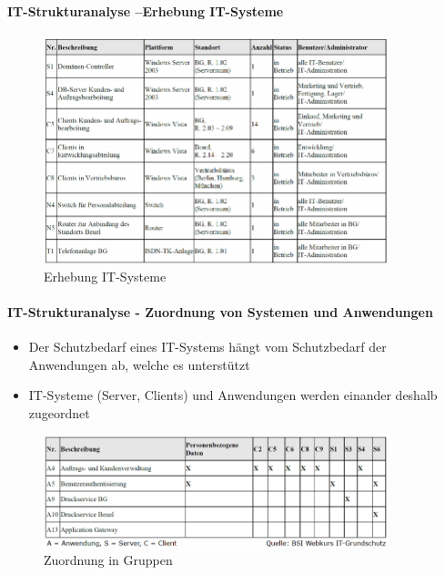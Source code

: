 \documentclass[10pt,a4paper]{article}
\begin{document}
\paragraph*{IT-Strukturanalyse –Erhebung IT-Systeme}
\begin{figure}[H]
    \begin{center}
    \includegraphics[width=10cm]{images/Erhebung IT-Systeme.png}
    \caption{Erhebung IT-Systeme}
    \label{Erhebung IT-Systeme}
    \end{center}
\end{figure}

\paragraph*{IT-Strukturanalyse - Zuordnung von Systemen und Anwendungen}
\begin{itemize}[noitemsep,topsep=0pt,leftmargin=*]
    \item Der Schutzbedarf eines IT-Systems hängt vom Schutzbedarf der Anwendungen ab, welche es unterstützt
    \item IT-Systeme (Server, Clients) und Anwendungen werden einander deshalb zugeordnet
\end{itemize}
\begin{figure}[H]
    \begin{center}
    \includegraphics[width=10cm]{images/Zuordnung_Sys_App.png}
    \caption{Zuordnung in Gruppen}
    \label{Zuordnung in Gruppen}
    \end{center}
\end{figure}
\end{document}
